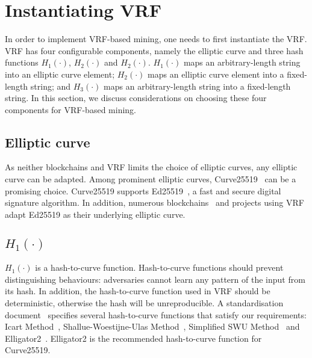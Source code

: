 \section{Instantiating VRF}




In order to implement VRF-based mining, one needs to first instantiate the VRF.
VRF has four configurable components, namely the elliptic curve and three hash functions $H_{1}(\cdot)$, $H_{2}(\cdot)$ and $H_{2}(\cdot)$.
$H_{1}(\cdot)$ maps an arbitrary-length string into an elliptic curve element;
$H_{2}(\cdot)$ maps an elliptic curve element into a fixed-length string; and
$H_{3}(\cdot)$ maps an arbitrary-length string into a fixed-length string.
In this section, we discuss considerations on choosing these four components for VRF-based mining.

\subsection{Elliptic curve}
As neither blockchains and VRF limits the choice of elliptic curves, any elliptic curve can be adapted.
Among prominent elliptic curves, Curve25519~\cite{} can be a promising choice.
Curve25519 supports Ed25519~\cite{}, a fast and secure digital signature algorithm.
In addition, numerous blockchains~\cite{} and projects using VRF~\cite{} adapt Ed25519 as their underlying elliptic curve.

\subsection{$H_{1}(\cdot)$}
$H_{1}(\cdot)$ is a hash-to-curve function.
Hash-to-curve functions should prevent distinguishing behaviours: adversaries cannot learn any pattern of the input from its hash.
In addition, the hash-to-curve function used in VRF should be deterministic, otherwise the hash will be unreproducible.
A standardisation document~\cite{} specifies several hash-to-curve functions that satisfy our requirements: Icart Method~\cite{}, Shallue-Woestijne-Ulas Method~\cite{}, Simplified SWU Method~\cite{} and Elligator2~\cite{}.
Elligator2 is the recommended hash-to-curve function for Curve25519.

